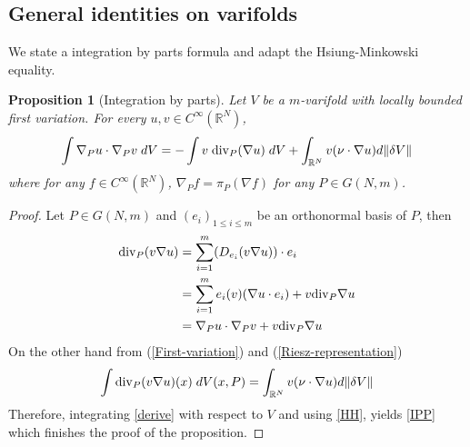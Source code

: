 \documentclass[12pt,english]{smfart} %
\newtheorem{proposition}[theorem]{Proposition}
\theoremstyle{remark}
\newcommand{\R}{\mathbb{R}}
\begin{document}
 
\subsection{General identities on varifolds} We state a integration by parts formula and adapt the Hsiung-Minkowski equality.

 \medskip\begin{proposition}[Integration by parts]\label{pIPP} Let $V$ be a $m$-varifold with locally bounded first variation. For every $u,v \in C^\infty(\mathbb{R}^N)$,
\begin{eqnarray}
 \int  \nabla_P u \cdot \nabla_P v \;dV = -\int  v \; {\rm div}_P(\nabla u) \; dV +\int_{\R^N}v(\nu\cdot\nabla u)d\|\delta V\| \label{IPP}
 \end{eqnarray} 
where for any $f\in C^\infty(\mathbb{R}^N)$, $\nabla_P f=\pi_P(\nabla f)$ for any $P\in G(N,m)$.  
 \end{proposition}
 
\begin{proof} Let $P\in G(N,m)$ and $(e_i)_{1\leqslant i\leqslant m}$ be an orthonormal basis of $P$, then
\begin{align}\label{derive}
{\rm div}_P(v\nabla u)&=\sum_{i=1}^m(D_{e_i}(v\nabla u))\cdot e_i\notag\\
&=\sum_{i=1}^m e_i(v)(\nabla u\cdot e_i)+v{\rm div}_P\nabla u\notag\\
&=\nabla_P u \cdot \nabla_P v+v{\rm div}_P\nabla u
\end{align}
On the other hand from (\ref{First-variation}) and (\ref{Riesz-representation})
\begin{equation}\label{HH}
\int{\rm div}_P(v\nabla u)(x)  \;dV(x,P)=\int_{\R^N}v(\nu\cdot\nabla u)d\|\delta V\|
\end{equation}
Therefore, integrating \eqref{derive} with respect to $V$ and using \eqref{HH}, yields \eqref{IPP} which finishes the proof of the proposition.
\end{proof} 
\end{document}
